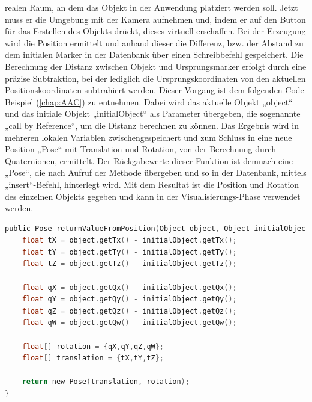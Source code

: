 realen Raum, an dem das Objekt in der Anwendung platziert werden soll. Jetzt muss er die Umgebung mit der Kamera aufnehmen und, indem er auf den Button für das 
Erstellen des Objekts drückt, dieses virtuell erschaffen. Bei der Erzeugung wird die Position ermittelt und anhand dieser die Differenz, bzw. der 
Abstand zu dem initialen Marker in der Datenbank über einen Schreibbefehl gespeichert. Die Berechnung der Distanz zwischen Objekt und 
Ursprungsmarker erfolgt durch eine präzise Subtraktion, bei der lediglich die Ursprungskoordinaten von den aktuellen Positionskoordinaten subtrahiert werden. 
Dieser Vorgang ist dem folgenden Code-Beispiel (\ref{chap:AAC}) zu entnehmen. Dabei wird das aktuelle Objekt „object“ und das initiale Objekt „initialObject“ 
als Parameter übergeben, die sogenannte „call by Reference“, um die Distanz berechnen zu können. Das Ergebnis wird in mehreren lokalen Variablen 
zwischengespeichert und zum Schluss in eine neue Position „Pose“ mit Translation und Rotation, von der Berechnung durch Quaternionen, ermittelt. Der Rückgabewerte 
dieser Funktion ist demnach eine „Pose“, die nach Aufruf der Methode übergeben und so in der Datenbank, mittels „insert“-Befehl, hinterlegt wird. Mit dem 
Resultat ist die Position und Rotation des einzelnen Objekts gegeben und kann in der Visualisierungs-Phase verwendet werden.
\\
\linebreak
\begin{lstlisting}[language=C,
    frame=lines,           % Ein Rahmen um den Code (single for box, lines for top and bottom)
    xleftmargin=\parindent,  % Rahmen link von den Zahlen
    style=algoBericht,
    label={code:differencetoinitial},
    captionpos=b,           % Caption unter den Code setzen
caption={Berechnung der Distanz zwischen Marker und Ursprungspunkt}]
public Pose returnValueFromPosition(Object object, Object initialObject){
    float tX = object.getTx() - initialObject.getTx();
    float tY = object.getTy() - initialObject.getTy();
    float tZ = object.getTz() - initialObject.getTz();

    float qX = object.getQx() - initialObject.getQx();
    float qY = object.getQy() - initialObject.getQy();
    float qZ = object.getQz() - initialObject.getQz();
    float qW = object.getQw() - initialObject.getQw();

    float[] rotation = {qX,qY,qZ,qW};
    float[] translation = {tX,tY,tZ};

    return new Pose(translation, rotation);
}
\end{lstlisting}
